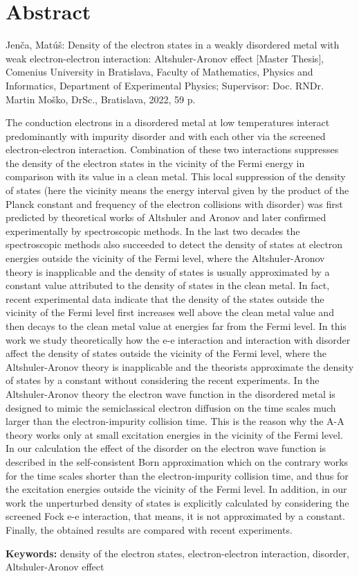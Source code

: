 
\thispagestyle{empty}
\section*{Abstract}

Jenča, Matúš: Density of the electron states in a weakly disordered metal with weak electron-electron interaction: Altshuler-Aronov effect [Master
Thesis], Comenius University in Bratislava, Faculty of Mathematics, Physics and Informatics, Department of Experimental Physics; Supervisor: Doc. RNDr. Martin Moško, DrSc., Bratislava, 2022, 59 p.

The conduction electrons in a disordered metal at low temperatures interact predominantly with impurity disorder and with each other via the screened electron-electron interaction. Combination of these 
two interactions suppresses the density of the electron states in the vicinity of the Fermi energy in comparison with its value in a clean metal.
This local suppression of the density of states (here the vicinity means the energy interval given by the product of the Planck constant and frequency of the electron collisions with disorder) was first predicted by theoretical works of Altshuler and Aronov and later confirmed experimentally by spectroscopic methods. In the last two decades the spectroscopic methods also succeeded to detect the density of states at electron energies outside the vicinity of the Fermi level, where the Altshuler-Aronov theory is inapplicable and the density of states is usually approximated by a constant value attributed to the density of states in the clean metal.
In fact, recent experimental data indicate that the density of the states outside the vicinity of the Fermi level first increases well above the clean metal value and then decays to the clean metal value at energies far from the Fermi level. In this work we study theoretically how the e-e interaction and interaction with disorder affect the density of states outside the vicinity of the Fermi level, where
the Altshuler-Aronov theory is inapplicable and the theorists approximate the density of states by a constant without considering the recent experiments.
In the Altshuler-Aronov theory the electron wave function in the disordered metal is designed to mimic the semiclassical electron diffusion on the time scales much larger than the electron-impurity collision time.
This is the reason why the A-A theory works only at small excitation energies in the vicinity of the Fermi level. In our calculation the effect of the disorder on the electron wave function is described in the
self-consistent Born approximation which on the contrary works for the time scales shorter than the electron-impurity collision time, and thus for the excitation energies outside the vicinity of the Fermi level.
In addition, in our work the unperturbed density of states is explicitly calculated by considering the screened Fock e-e interaction, that means, it is not approximated by a constant. Finally, the obtained results are compared
with recent experiments.

\begin{flushleft}
  \textbf{Keywords:} density of the electron states, electron-electron interaction, disorder, Altshuler-Aronov effect
\end{flushleft}

